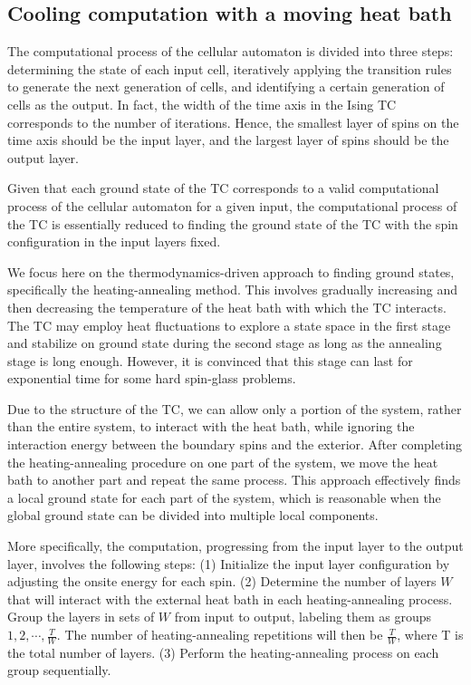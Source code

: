 \documentclass[twocolumn,superscriptaddress,english,showpacs,longbibliography]{revtex4-2}
\begin{document}
\subsection{Cooling computation with a moving heat bath}\label{cooling-computation-with-moving-heat-bath}

The computational process of the cellular automaton is divided into three steps: determining the state of each input cell, iteratively applying the transition rules to generate the next generation of cells, and identifying a certain generation of cells as the output. In fact, the width of the time axis in the Ising TC corresponds to the number of iterations. Hence, the smallest layer of spins on the time axis should be the input layer, and the largest layer of spins should be the output layer. 

Given that each ground state of the TC corresponds to a valid computational process of the cellular automaton for a given input, the computational process of the TC is essentially reduced to finding the ground state of the TC with the spin configuration in the input layers fixed.

We focus here on the thermodynamics-driven approach to finding ground states, specifically the heating-annealing method. This involves gradually increasing and then decreasing the temperature of the heat bath with which the TC interacts. The TC may employ heat fluctuations to explore a state space in the first stage and stabilize on ground state during the second stage as long as the annealing stage is long enough. However, it is convinced that this stage can last for exponential time for some hard spin-glass problems.

Due to the structure of the TC, we can allow only a portion of the system, rather than the entire system, to interact with the heat bath, while ignoring the interaction energy between the boundary spins and the exterior. After completing the heating-annealing procedure on one part of the system, we move the heat bath to another part and repeat the same process. This approach effectively finds a local ground state for each part of the system, which is reasonable when the global ground state can be divided into multiple local components.

More specifically, the computation, progressing from the input layer to the output layer, involves the following steps: (1) Initialize the input layer configuration by adjusting the onsite energy for each spin. (2) Determine the number of layers $W$ that will interact with the external heat bath in each heating-annealing process. Group the layers in sets of $W$ from input to output, labeling them as groups $1, 2, \cdots, \frac{T}{W}$. The number of heating-annealing repetitions will then be $\frac{T}{W}$, where T is the total number of layers. (3) Perform the heating-annealing process on each group sequentially.
\end{document}
